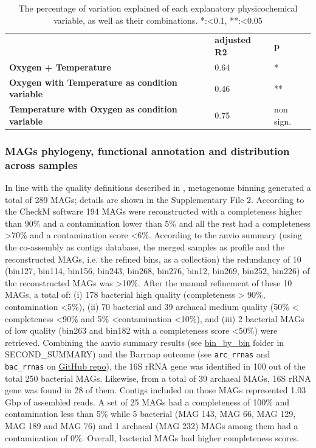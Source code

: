    \begin{table}[]
      \begin{tabular}{lll}
      \textbf{} & \textbf{adjusted R2} & \textbf{p} \\
      \textbf{Oxygen + Temperature} & 0.64 & * \\
      \textbf{Oxygen with Temperature as condition variable} & 0.46 & ** \\
      \textbf{Temperature with Oxygen as condition variable} & 0.75 & non sign.
      \end{tabular}
      \caption[Physicochemical variables explored]{The percentage of variation explained of each explanatory physicochemical variable, as well as their combinations. *:<0.1, **:<0.05}
      \label{table:psysicochem}
   \end{table}

\subsubsection*{MAGs phylogeny, functional annotation and distribution across samples}

   In line with the quality definitions described in \citep{bowers_minimum_2017}, metagenome binning generated a total of 289 MAGs; 
   details are shown in the Supplementary File 2. 
   According to the CheckM software 194 MAGs were reconstructed with a completeness higher than 90\% and a contamination lower than 5\% and 
   all the rest had a completeness >70\% and a contamination score <6\%. 
   According to the anvio summary (using the co-assembly as contigs database, the merged samples as profile and the reconstructed MAGs, i.e. the refined bins, as a collection) 
   the redundancy of 10 (bin127, bin114, bin156, bin243, bin268, bin276, bin12, bin269, bin252, bin226) of the reconstructed MAGs was >10\%. 
   After the manual refinement of these 10 MAGs, a total of: (i) 178 bacterial high quality (completeness > 90\%, contamination <5\%), 
   (ii) 70 bacterial and 39 archaeal medium quality (50\% < completeness <90\% and 5\% <contamination <10\%), and 
   (iii) 2 bacterial MAGs of low quality (bin263 and bin182 with a completeness score <50\%) were retrieved. 
   Combining the anvio summary results (see \href{https://github.com/hariszaf/karpathos-swamp/tree/main/anvio/SECOND_SUMMARY/bin_by_bin}{bin\_by\_bin} folder in SECOND\_SUMMARY) and 
   the Barrnap outcome (see \texttt{arc\_rrnas} and \texttt{bac\_rrnas} on \href{https://github.com/hariszaf/karpathos-swamp/tree/main/barrnap}{GitHub repo}), 
   the 16S rRNA gene was identified in 100 out of the total 250 bacterial MAGs. 
   Likewise, from a total of 39 archaeal MAGs, 16S rRNA gene was found in 28 of them. 
   Contigs included on those MAGs represented 1.03 Gbp of assembled reads. 
   A set of 25 MAGs had a completeness of 100\% and contamination less than 5\% while 5 bacterial (MAG 143, MAG 66, MAG 129, MAG 189 and MAG 76) 
   and 1 archaeal (MAG 232) MAGs among them had a contamination of 0\%. 
   Overall, bacterial MAGs had higher completeness scores. 


